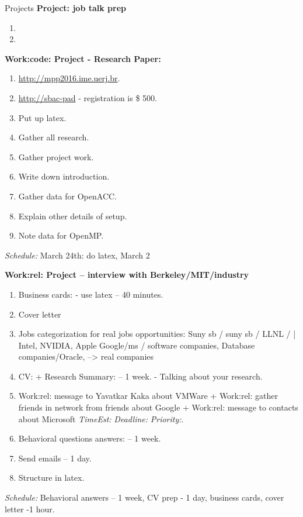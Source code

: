 \documentclass[serif, mathserif, final]{beamer}
\newcommand{\te}[1]{\textit{TimeEst:}\textit{#1}}
\newcommand{\dl}[1]{\textit{Deadline:}\textit{#1}}
\newcommand{\pr}[1]{\textit{Priority:}\textit{#1}}
\begin{document}
\begin{frame}
\begin{columns}
\begin{block}{Projects}
{ \bf Project: job talk prep} 
\begin{enumerate} 
\tiny \item \tiny 
\item \tiny 
\end{enumerate} 

{\bf Work:code: Project - Research Paper:}  
\begin{enumerate} 
\tiny \item \tiny \url{http://mpp2016.ime.uerj.br}. 
\item \tiny \url {http://sbac-pad}  - registration is  \$ 500. 
\item \tiny Put up latex.  
\item \tiny Gather all research. 
\item \tiny Gather project work. 
\item \tiny Write down introduction.
\item \tiny Gather data for OpenACC. 
\item \tiny Explain other details of setup. 
\item \tiny Note data for OpenMP. 
\end{enumerate} 
\textit{Schedule:} March 24th: do latex, March 2

{\bf Work:rel: Project – interview with Berkeley/MIT/industry} 
\begin{enumerate} 
\tiny \item \tiny Business cards:  - use latex  -- 40 minutes. 
\item \tiny Cover letter 
\item \tiny Jobs categorization for real jobs opportunities: 
Suny sb / suny sb / LLNL /  |  Intel, NVIDIA, Apple  Google/ms /
software companies, Database companies/Oracle,  --> real companies 
\tiny \item \tiny CV: + Research Summary:  -- 1 week.  - Talking about
  your research.
\item \tiny Work:rel: message to Yavatkar Kaka about VMWare +
  Work:rel: gather friends in network from friends about Google +
  Work:rel: message to contacts about Microsoft \te{} \dl{} \pr{}. 
\item \tiny Behavioral questions answers:    -- 1 week. 
\item \tiny Send emails – 1 day. 
\item \tiny Structure in latex. 
\end{enumerate}  
\textit{Schedule:} Behavioral answers – 1 week, CV prep - 1 day,
business cards, cover letter -1 hour. 


\end{block}
\end{columns}
\end{frame}
\end{document}
